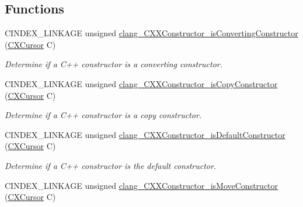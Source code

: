 \subsection*{Functions}
\begin{DoxyCompactItemize}
\item 
\mbox{\label{group__CINDEX__CPP_ga64f60658013fe2cc9f568fe5a5f55d4f}} 
C\+I\+N\+D\+E\+X\+\_\+\+L\+I\+N\+K\+A\+GE unsigned \hyperlink{group__CINDEX__CPP_ga64f60658013fe2cc9f568fe5a5f55d4f}{clang\+\_\+\+C\+X\+X\+Constructor\+\_\+is\+Converting\+Constructor} (\hyperlink{structCXCursor}{C\+X\+Cursor} C)
\begin{DoxyCompactList}\small\item\em Determine if a C++ constructor is a converting constructor. \end{DoxyCompactList}\item 
\mbox{\label{group__CINDEX__CPP_ga0c6580828662fd27cb7152e47c1b3e4e}} 
C\+I\+N\+D\+E\+X\+\_\+\+L\+I\+N\+K\+A\+GE unsigned \hyperlink{group__CINDEX__CPP_ga0c6580828662fd27cb7152e47c1b3e4e}{clang\+\_\+\+C\+X\+X\+Constructor\+\_\+is\+Copy\+Constructor} (\hyperlink{structCXCursor}{C\+X\+Cursor} C)
\begin{DoxyCompactList}\small\item\em Determine if a C++ constructor is a copy constructor. \end{DoxyCompactList}\item 
\mbox{\label{group__CINDEX__CPP_ga4c15c2e3e4dd6258cbf26547dd76229b}} 
C\+I\+N\+D\+E\+X\+\_\+\+L\+I\+N\+K\+A\+GE unsigned \hyperlink{group__CINDEX__CPP_ga4c15c2e3e4dd6258cbf26547dd76229b}{clang\+\_\+\+C\+X\+X\+Constructor\+\_\+is\+Default\+Constructor} (\hyperlink{structCXCursor}{C\+X\+Cursor} C)
\begin{DoxyCompactList}\small\item\em Determine if a C++ constructor is the default constructor. \end{DoxyCompactList}\item 
\mbox{\label{group__CINDEX__CPP_gaa1cb77ef71cca950b8ec7d1e6666a8a2}} 
C\+I\+N\+D\+E\+X\+\_\+\+L\+I\+N\+K\+A\+GE unsigned \hyperlink{group__CINDEX__CPP_gaa1cb77ef71cca950b8ec7d1e6666a8a2}{clang\+\_\+\+C\+X\+X\+Constructor\+\_\+is\+Move\+Constructor} (\hyperlink{structCXCursor}{C\+X\+Cursor} C)

\end{DoxyCompactItemize}
